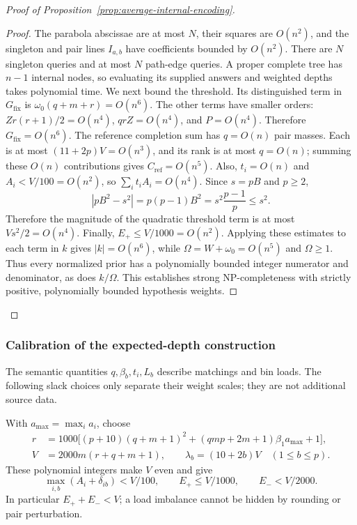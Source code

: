 \begin{proof}[Proof of Proposition~\ref{prop:average-internal-encoding}]
\begin{proof}
The parabola abscissae are at most $N$, their squares are $O(n^2)$,
and the singleton and pair lines $I_{a,b}$ have coefficients bounded
by $O(n^2)$. There are $N$ singleton queries and at most $N$
path-edge queries. A proper complete tree has $n-1$ internal nodes,
so evaluating its supplied answers and weighted depths takes polynomial
time. We next bound the threshold. Its distinguished term in
$G_{\mathrm{fix}}$ is $\omega_0(q+m+r)=O(n^6)$. The other terms have
smaller orders: $Zr(r+1)/2=O(n^4)$, $qrZ=O(n^4)$, and $P=O(n^4)$.
Therefore $G_{\mathrm{fix}}=O(n^6)$. The reference completion sum has
$q=O(n)$ pair masses. Each is at most $(11+2p)V=O(n^3)$, and its rank
is at most $q=O(n)$; summing these $O(n)$ contributions gives
$C_{\mathrm{ref}}=O(n^5)$. Also, $t_i=O(n)$ and $A_i<V/100=O(n^2)$,
so $\sum_i t_iA_i=O(n^4)$. Since $s=pB$ and $p\ge2$,
\[
 \left|pB^2-s^2\right|=p(p-1)B^2
   =s^2\frac{p-1}{p}\le s^2.
\]
Therefore the magnitude of the quadratic threshold term is at most
$Vs^2/2=O(n^4)$.
Finally, $E_+\le V/1000=O(n^2)$. Applying
these estimates to each term in $k$ gives $|k|=O(n^6)$, while
$\Omega=W+\omega_0=O(n^5)$ and $\Omega\ge1$. Thus every normalized
prior has a polynomially bounded integer numerator and denominator,
as does $k/\Omega$. This establishes strong NP-completeness with
strictly positive, polynomially bounded hypothesis weights.
\end{proof}
\end{proof}

\subsubsection{Calibration of the expected-depth construction}
\label{sec:average-hardness-calibration}

The semantic quantities $q,\beta_b,t_i,L_b$ describe matchings and
bin loads. The following slack choices only separate their weight
scales; they are not additional source data.
\begin{parameterchoice}
With $a_{\max}=\max_i a_i$, choose
\[
 \begin{aligned}
 r&=1000\bigl[(p+10)(q+m+1)^2
             +(qmp+2m+1)\beta_1a_{\max}+1\bigr],\\
 V&=2000m(r+q+m+1),\qquad
 \lambda_b=(10+2b)V\quad(1\le b\le p).
 \end{aligned}
\]
These polynomial integers make $V$ even and give
\begin{equation}\label{eq:expected-scale-bounds}
 \max_{i,b}(A_i+\delta_{ib})<V/100,\qquad
 E_+\le V/1000,\qquad E_-<V/2000.
\end{equation}
In particular $E_++E_-<V$; a load imbalance cannot be hidden by
rounding or pair perturbation.
\end{parameterchoice}

